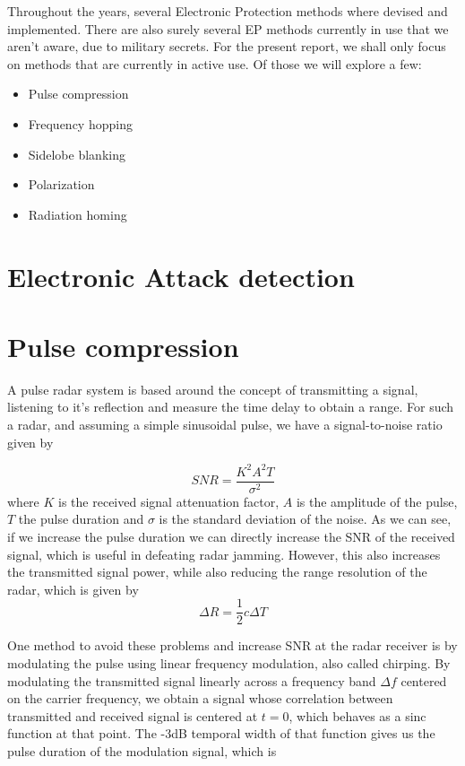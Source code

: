 \documentclass[english,purist]{ist-report}
\begin{document}
Throughout the years, several Electronic Protection methods where devised and implemented. There are also surely several EP methods currently in use that we aren't aware, due to military secrets. For the present report, we shall only focus on methods that are currently in active use. Of those we will explore a few:
\begin{itemize}
    \item Pulse compression
    \item Frequency hopping
    \item Sidelobe blanking
    \item Polarization
    \item Radiation homing
\end{itemize}


\section{Electronic Attack detection}

\section{Pulse compression}

A pulse radar system is based around the concept of transmitting a signal, listening to it's reflection and measure the time delay to obtain a range. For such a radar, and assuming a simple sinusoidal pulse, we have a signal-to-noise ratio given by 

$$
SNR = \frac{K^2 A^2 T}{\sigma^2}
$$
where $K$ is the received signal attenuation factor, $A$ is the amplitude of the pulse, $T$ the pulse duration and $\sigma$ is the standard deviation of the noise. As we can see, if we increase the pulse duration we can directly increase the SNR of the received signal, which is useful in defeating radar jamming. However, this also increases the transmitted signal power, while also reducing the range resolution of the radar, which is given by
$$
\Delta R = \frac{1}{2} c \Delta T
$$

One method to avoid these problems and increase SNR at the radar receiver is by modulating the pulse using linear frequency modulation, also called chirping. By modulating the transmitted signal linearly across a frequency band $\Delta f$ centered on the carrier frequency, we obtain a signal whose correlation between transmitted and received signal is centered at $t = 0$, which behaves as a sinc function at that point. The -3dB temporal width of that function gives us the pulse duration of the modulation signal, which is
\end{document}
